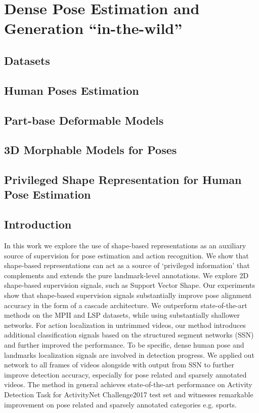 \chapter{Dense Pose Estimation and Generation ``in-the-wild''}

\section{Datasets}

\section{Human Poses Estimation}

\section{Part-base Deformable Models}

\section{3D Morphable Models for Poses}

\section{Privileged Shape Representation for Human Pose Estimation}

\section{Introduction}

In this work we explore the use of shape-based representations as an auxiliary source of supervision for pose estimation and action recognition. We show that shape-based representations  can act as a source of `privileged information' that complements and extends the pure landmark-level annotations. We explore 2D shape-based supervision signals, such as Support Vector Shape. Our experiments show that shape-based supervision signals substantially improve pose alignment accuracy in the form of a cascade architecture. We outperform state-of-the-art methods on the MPII and LSP datasets, while using substantially shallower networks. For action localization in untrimmed videos, our method introduces additional classification signals based on the structured segment networks (SSN) and further improved the performance. To be specific, dense human pose and landmarks localization signals are involved in detection progress. We applied out network to all frames of videos alongside with output from SSN to further improve detection accuracy, especially for pose related and sparsely annotated videos. The method in general achieves state-of-the-art performance on Activity Detection Task for ActivityNet Challenge2017 test set and witnesses remarkable improvement on pose related and sparsely annotated categories e.g. sports.

